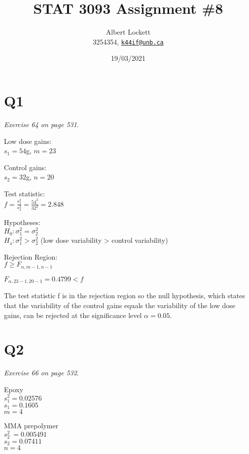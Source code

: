 \documentclass[a4paper,11pt]{article}
\begin{document}
\title{STAT 3093 Assignment \#8}
\author{
  Albert Lockett \\ 
  3254354, 
  \href{mailto:k44if@unb.ca}{\texttt{k44if@unb.ca}}
  }
\date{19/03/2021}

\section*{Q1}
\textit{Exercise 64 on page 531.}\newline

Low dose gains:\\ $s_1 = 54$g, $m = 23$ 

Control gains:\\ $s_2 = 32$g, $n = 20$\newline


Test statistic:\\ $f = \frac{s_1^2}{s_2^2} = \frac{54^2}{32^2} = 2.848$\newline

Hypotheses:\\
$H_0: \sigma_1^2 = \sigma_2^2$\\
$H_\text{a}: \sigma_1^2 > \sigma_2^2$ (low dose variability > control variability)\newline

Rejection Region:\\
$f \ge F_{\alpha,m-1,n-1}$\newline

$F_{\alpha,23-1,20-1} = 0.4799 < f$\newline

The test statistic f is in the rejection region so the null hypothesis, which states that the variability of the
control gains equals the variability of the low dose gains, can be rejected at the significance level $\alpha = 0.05$.

\pagebreak

\section*{Q2}
\textit{Exercise 66 on page 532.}\newline

Epoxy\\ 
$s_1^2 = 0.02576$\\
$s_1 = 0.1605$\\ 
$m = 4$\newline

MMA prepolymer\\
$s_2^2\ = 0.005491$\\
$s_2 = 0.07411$\\
$n = 4$\newline
\end{document}
